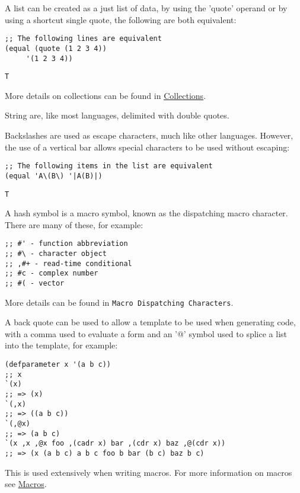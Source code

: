 \documentclass[11pt]{article}
\begin{document}
A list can be created as a just list of data, by using the 'quote'
operand or by using a shortcut single quote, the following are both
equivalent:

\begin{verbatim}
;; The following lines are equivalent
(equal (quote (1 2 3 4))
     '(1 2 3 4))
\end{verbatim}
\begin{verbatim}
T
\end{verbatim}

More details on collections can be found in \hyperref[sec-4]{Collections}.

String are, like most languages, delimited with double quotes.

Backslashes are used as escape characters, much like other
languages. However, the use of a vertical bar allows special
characters to be used without escaping:

\begin{verbatim}
;; The following items in the list are equivalent
(equal 'A\(B\) '|A(B)|)
\end{verbatim}
\begin{verbatim}
T
\end{verbatim}

A hash symbol is a macro symbol, known as the dispatching macro
character. There are many of these, for example:

\begin{verbatim}
;; #' - function abbreviation
;; #\ - character object
;; ,#+ - read-time conditional
;; #c - complex number
;; #( - vector
\end{verbatim}

More details can be found in \texttt{Macro Dispatching Characters}.

A back quote can be used to allow a template to be used when
generating code, with a comma used to evaluate a form and an '@'
symbol used to splice a list into the template, for example:

\begin{verbatim}
(defparameter x '(a b c))
;; x
`(x)
;; => (x)
`(,x)
;; => ((a b c))
`(,@x)
;; => (a b c)
`(x ,x ,@x foo ,(cadr x) bar ,(cdr x) baz ,@(cdr x))
;; => (x (a b c) a b c foo b bar (b c) baz b c)
\end{verbatim}


This is used extensively when writing macros. For more information
on macros see \hyperref[sec-10]{Macros}.
\end{document}
